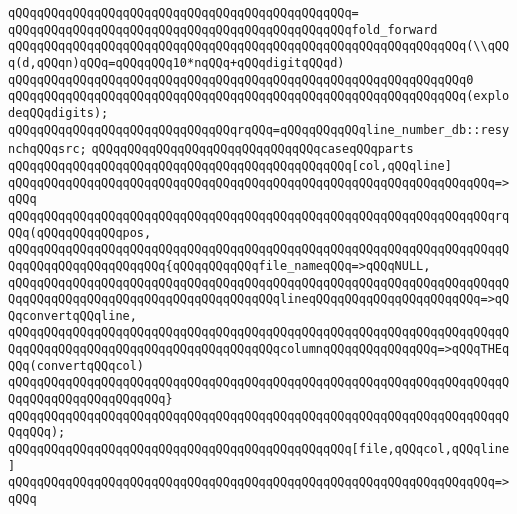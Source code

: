 \verb|qQQqqQQqqQQqqQQqqQQqqQQqqQQqqQQqqQQqqQQqqQQqqQQq=|\newline
\verb|qQQqqQQqqQQqqQQqqQQqqQQqqQQqqQQqqQQqqQQqqQQqqQQqfold_forward|\newline
\verb|qQQqqQQqqQQqqQQqqQQqqQQqqQQqqQQqqQQqqQQqqQQqqQQqqQQqqQQqqQQqqQQq(\\qQQq(d,qQQqn)qQQq=qQQqqQQq10*nqQQq+qQQqdigitqQQqd)|\newline
\verb|qQQqqQQqqQQqqQQqqQQqqQQqqQQqqQQqqQQqqQQqqQQqqQQqqQQqqQQqqQQqqQQq0|\newline
\verb|qQQqqQQqqQQqqQQqqQQqqQQqqQQqqQQqqQQqqQQqqQQqqQQqqQQqqQQqqQQqqQQq(explodeqQQqdigits);|\newline
\newline
\verb|qQQqqQQqqQQqqQQqqQQqqQQqqQQqqQQqrqQQq=qQQqqQQqqQQqline_number_db::resynchqQQqsrc;|\newline
\newline
\verb|qQQqqQQqqQQqqQQqqQQqqQQqqQQqqQQqcaseqQQqparts|\newline
\newline
\verb|qQQqqQQqqQQqqQQqqQQqqQQqqQQqqQQqqQQqqQQqqQQqqQQq[col,qQQqline]|\newline
\verb|qQQqqQQqqQQqqQQqqQQqqQQqqQQqqQQqqQQqqQQqqQQqqQQqqQQqqQQqqQQqqQQqqQQq=>qQQq|\newline
\verb|qQQqqQQqqQQqqQQqqQQqqQQqqQQqqQQqqQQqqQQqqQQqqQQqqQQqqQQqqQQqqQQqqQQqrqQQq(qQQqqQQqqQQqpos,|\newline
\verb|qQQqqQQqqQQqqQQqqQQqqQQqqQQqqQQqqQQqqQQqqQQqqQQqqQQqqQQqqQQqqQQqqQQqqQQqqQQqqQQqqQQqqQQqqQQq{qQQqqQQqqQQqfile_nameqQQq=>qQQqNULL,|\newline
\verb|qQQqqQQqqQQqqQQqqQQqqQQqqQQqqQQqqQQqqQQqqQQqqQQqqQQqqQQqqQQqqQQqqQQqqQQqqQQqqQQqqQQqqQQqqQQqqQQqqQQqqQQqqQQqlineqQQqqQQqqQQqqQQqqQQqqQQq=>qQQqconvertqQQqline,|\newline
\verb|qQQqqQQqqQQqqQQqqQQqqQQqqQQqqQQqqQQqqQQqqQQqqQQqqQQqqQQqqQQqqQQqqQQqqQQqqQQqqQQqqQQqqQQqqQQqqQQqqQQqqQQqqQQqcolumnqQQqqQQqqQQqqQQq=>qQQqTHEqQQq(convertqQQqcol)|\newline
\verb|qQQqqQQqqQQqqQQqqQQqqQQqqQQqqQQqqQQqqQQqqQQqqQQqqQQqqQQqqQQqqQQqqQQqqQQqqQQqqQQqqQQqqQQqqQQq}|\newline
\verb|qQQqqQQqqQQqqQQqqQQqqQQqqQQqqQQqqQQqqQQqqQQqqQQqqQQqqQQqqQQqqQQqqQQqqQQqqQQq);|\newline
\newline
\verb|qQQqqQQqqQQqqQQqqQQqqQQqqQQqqQQqqQQqqQQqqQQqqQQq[file,qQQqcol,qQQqline]|\newline
\verb|qQQqqQQqqQQqqQQqqQQqqQQqqQQqqQQqqQQqqQQqqQQqqQQqqQQqqQQqqQQqqQQqqQQq=>qQQq|\newline
